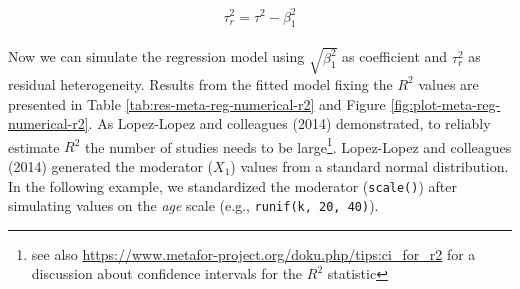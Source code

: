 \documentclass[
  man,floatsintext]{apa6}
\begin{document}
\begin{align}
\begin{aligned}
\tau^2_{r} = \tau^2 - \beta^2_1
\label{eq:beta-from-r22}
\end{aligned}
\end{align}

Now we can simulate the regression model using \(\sqrt{\beta^2_1}\) as coefficient and \(\tau_{r}^{2}\) as residual heterogeneity. Results from the fitted model fixing the \(R^{2}\) values are presented in Table \ref{tab:res-meta-reg-numerical-r2} and Figure \ref{fig:plot-meta-reg-numerical-r2}. As Lopez-Lopez and colleagues (2014) demonstrated, to reliably estimate \(R^{2}\) the number of studies needs to be large\footnote{see also \url{https://www.metafor-project.org/doku.php/tips:ci_for_r2} for a discussion about confidence intervals for the \(R^2\) statistic}. Lopez-Lopez and colleagues (2014) generated the moderator (\(X_{1}\)) values from a standard normal distribution. In the following example, we standardized the moderator (\texttt{scale()}) after simulating values on the \emph{age} scale (e.g., \texttt{runif(k,\ 20,\ 40)}).

\scriptsize
\end{document}
